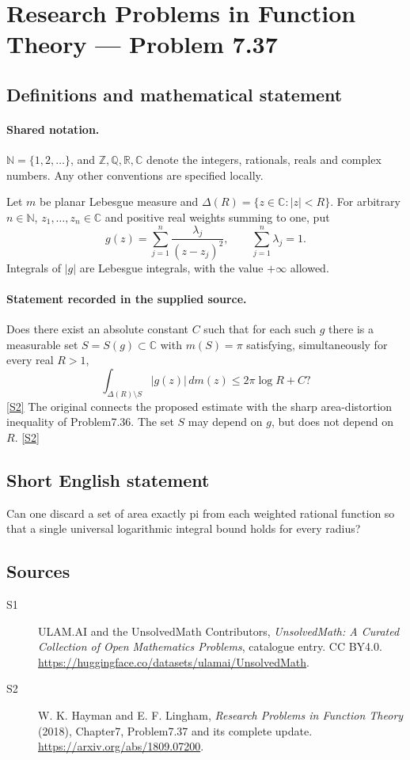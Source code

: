 \documentclass[11pt]{article}
\newcommand{\sref}[2]{\hyperlink{source:#1:#2}{[S#2]}}
\begin{document}
\section{Research Problems in Function Theory — Problem 7.37}\label{statement}

\subsection{Definitions and mathematical statement}

\paragraph{Shared notation.}$\mathbb N=\{1,2,\ldots\}$, and $\mathbb Z,\mathbb Q,\mathbb R,\mathbb C$ denote the integers, rationals, reals and complex numbers. Any other conventions are specified locally.


Let $m$ be planar Lebesgue measure and $\Delta(R)=\{z\in\mathbb C:|z|<R\}$. For arbitrary $n\in\mathbb N$, $z_1,\ldots,z_n\in\mathbb C$ and positive real weights summing to one, put
\[g(z)=\sum_{j=1}^n\frac{\lambda_j}{(z-z_j)^2},\qquad \sum_{j=1}^n\lambda_j=1.\]
Integrals of $|g|$ are Lebesgue integrals, with the value $+\infty$ allowed.

\paragraph{Statement recorded in the supplied source.}
Does there exist an absolute constant $C$ such that for each such $g$ there is a measurable set $S=S(g)\subset\mathbb C$ with $m(S)=\pi$ satisfying, simultaneously for every real $R>1$,
\[\int_{\Delta(R)\setminus S}|g(z)|\,dm(z)\le2\pi\log R+C?\] \sref{statement}{2}
The original connects the proposed estimate with the sharp area-distortion inequality of Problem7.36. The set $S$ may depend on $g$, but does not depend on $R$. \sref{statement}{2}
\subsection{Short English statement}
Can one discard a set of area exactly pi from each weighted rational function so that a single universal logarithmic integral bound holds for every radius?
\subsection{Sources}
\begin{description}
\item[\hypertarget{source:statement:1}{S1}] ULAM.AI and the UnsolvedMath Contributors, \emph{UnsolvedMath: A Curated Collection of Open Mathematics Problems}, catalogue entry. CC BY4.0. \url{https://huggingface.co/datasets/ulamai/UnsolvedMath}.
\item[\hypertarget{source:statement:2}{S2}] W. K. Hayman and E. F. Lingham, \emph{Research Problems in Function Theory} (2018), Chapter7, Problem7.37 and its complete update. \url{https://arxiv.org/abs/1809.07200}.
\end{description}
\label{end:statement}
\end{document}
